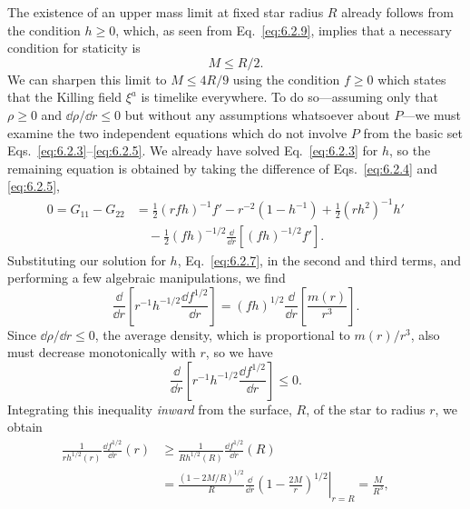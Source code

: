 The existence of an upper mass limit at fixed star radius \(R\) already follows
from the condition \(h\geq0\), which, as seen from Eq.~\eqref{eq:6.2.9}, implies
that a necessary condition for staticity is
\begin{equation}
  M\leq R/2.
  \tag{6.2.32}\label{eq:6.2.32}
\end{equation}
We can sharpen this limit to \(M\leq4R/9\) using the condition \(f\geq0\) which
states that the Killing field \(\xi^a\) is timelike everywhere. To do
so---assuming only that \(\rho\geq0\) and \(\dd\rho/\dd r\leq0\) but without any
assumptions whatsoever about \(P\)---we must examine the two independent
equations which do not involve \(P\) from the basic set
Eqs.~\eqref{eq:6.2.3}--\eqref{eq:6.2.5}. We already have solved
Eq.~\eqref{eq:6.2.3} for \(h\), so the remaining equation is obtained by taking
the difference of Eqs.~\eqref{eq:6.2.4} and \eqref{eq:6.2.5},
\begin{align}
  0=G_{11}-G_{22}
    &=\frac12(rfh)^{-1}f'-r^{-2}(1-h^{-1})+\frac12(rh^2)^{-1}h'\nonumber\\
    &\quad-\frac12(fh)^{-1/2}\frac{\dd}{\dd r}\left[(fh)^{-1/2}f'\right].
  &&\tag{6.2.33}\label{eq:6.2.33}
\end{align}
Substituting our solution for \(h\), Eq.~\eqref{eq:6.2.7}, in the second and
third terms, and performing a few algebraic manipulations, we find
\begin{equation}
  \frac{\dd}{\dd r}\left[r^{-1}h^{-1/2}\frac{\dd f^{1/2}}{\dd r}\right]
  =(fh)^{1/2}\frac{\dd}{\dd r}\left[\frac{m(r)}{r^3}\right].
  \tag{6.2.34}\label{eq:6.2.34}
\end{equation}
Since \(\dd\rho/\dd r\leq0\), the average density, which is proportional to
\(m(r)/r^3\), also must decrease monotonically with \(r\), so we have
\begin{equation}
  \frac{\dd}{\dd r}\left[r^{-1}h^{-1/2}\frac{\dd f^{1/2}}{\dd r}\right]\leq0.
  \tag{6.2.35}\label{eq:6.2.35}
\end{equation}
Integrating this inequality \emph{inward} from the surface, \(R\), of the star to
radius \(r\), we obtain
\begin{align}
  \frac{1}{rh^{1/2}(r)}\frac{\dd f^{1/2}}{\dd r}(r)
    &\geq\frac{1}{Rh^{1/2}(R)}\frac{\dd f^{1/2}}{\dd r}(R)\nonumber\\
    &=\frac{(1-2M/R)^{1/2}}{R}
      \left.\frac{\dd}{\dd r}\left(1-\frac{2M}{r}\right)^{1/2}\right|_{r=R}
      =\frac{M}{R^3},
  &&\tag{6.2.36}\label{eq:6.2.36}
\end{align}
